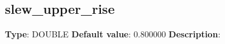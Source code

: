 \subsection*{slew_upper_rise}
\textbf{Type}: DOUBLE\newline
\textbf{Default value}: 0.800000\newline
\textbf{Description}: